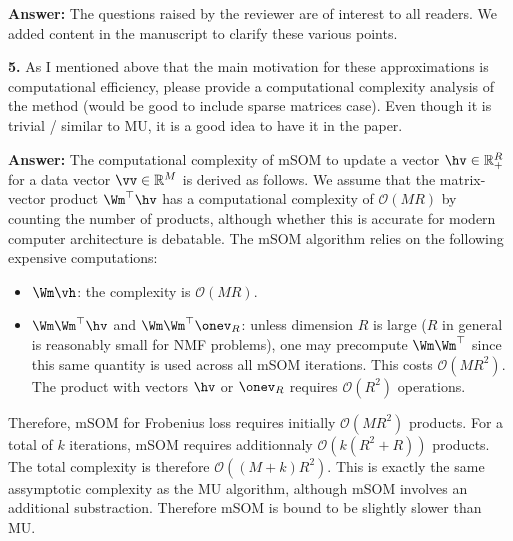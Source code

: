 \documentclass[10pt]{article} %
\newcommand{\answer}[1]{{\textbf{Answer:} \color{blue} #1}}
\begin{document}
\answer{The questions raised by the reviewer are of interest to all readers. We added content in the manuscript to clarify these various points.}

\textbf{5.} As I mentioned above that the main motivation for these approximations is computational efficiency, please provide a computational complexity analysis of the method (would be good to include sparse matrices case). Even though it is trivial / similar to MU, it is a good idea to have it in the paper.

\answer{
The computational complexity of mSOM to update a vector $\hv\in\mathbb{R}_+^{R}$ for a data vector $\vv\in\mathbb{R}^M$ is derived as follows. We assume that the matrix-vector product $\Wm^\top\hv$ has a computational complexity of $\mathcal{O}(MR)$ by counting the number of products, although whether this is accurate for modern computer architecture is debatable. The mSOM algorithm relies on the following expensive computations:
\begin{itemize}
    \item $\Wm\vh$: the complexity is $\mathcal{O}(MR)$.
    \item $\Wm\Wm^\top\hv$ and $\Wm\Wm^\top\onev_R$: unless dimension $R$ is large ($R$ in general is reasonably small for NMF problems), one may precompute $\Wm\Wm^\top$ since this same quantity is used across all mSOM iterations. This costs $\mathcal{O}(MR^2)$. The product with vectors $\hv$ or $\onev_R$ requires $\mathcal{O}(R^2)$ operations.
\end{itemize}
Therefore, mSOM for Frobenius loss requires initially $\mathcal{O}(MR^2)$ products. For a total of $k$ iterations, mSOM requires additionnaly $\mathcal{O}(k(R^2+R))$ products. The total complexity is therefore $\mathcal{O}((M+k)R^2)$. This is exactly the same assymptotic complexity as the MU algorithm, although mSOM involves an additional substraction. Therefore mSOM is bound to be slightly slower than MU.

}
\end{document}

